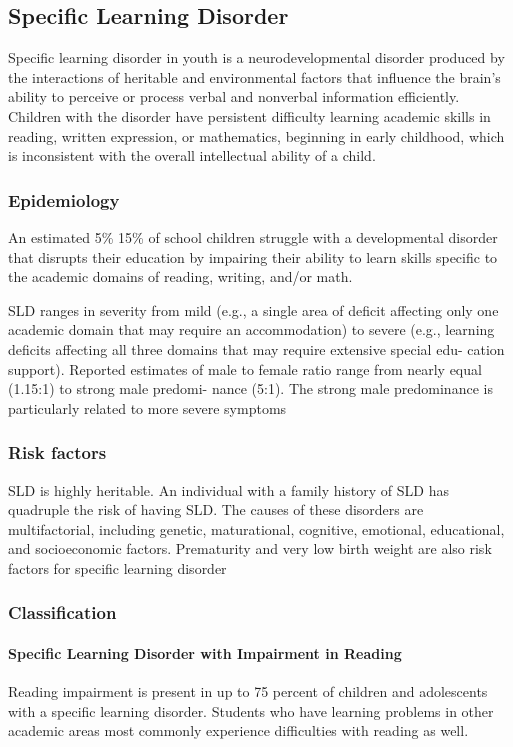 \subsection{Specific Learning Disorder}
Specific learning disorder in youth is a neurodevelopmental disorder produced by the interactions of heritable and environmental factors that influence the brain’s ability to perceive or process verbal and nonverbal information efficiently. Children with the disorder have persistent difficulty learning academic skills in reading, written expression, or mathematics, beginning in early childhood, which is inconsistent with the overall intellectual ability of a child. \cite{Boland2021-by}

\subsubsection{Epidemiology}
An estimated 5\% 15\% of school children struggle with a developmental disorder
that disrupts their education by impairing their ability to learn skills specific to the academic domains of reading, writing, and/or math. \cite{Frierson2025}

SLD ranges in severity from mild (e.g., a single area of deficit affecting only one academic domain that may require
an accommodation) to severe (e.g., learning deficits affecting all three domains that may require extensive special edu-
cation support). Reported estimates of male to female ratio range from nearly equal (1.15:1) to strong male predomi-
nance (5:1). The strong male predominance is particularly related to more severe symptoms \cite{Frierson2025}

\subsubsection{Risk factors}
SLD is highly heritable. An individual with a family history of SLD has
quadruple the risk of having SLD. The causes of these disorders are
multifactorial, including genetic, maturational, cognitive, emotional,
educational, and socioeconomic factors. Prematurity and very low birth weight
are also risk factors for specific learning disorder \cite{Frierson2025, Boland2021-by}

\subsubsection{Classification}
\paragraph{Specific Learning Disorder with Impairment in Reading}
Reading impairment is present in up to 75 percent of children and adolescents
with a specific learning disorder. Students who have learning problems in other
academic areas most commonly experience difficulties with reading as well.
\cite{Boland2021-by}

